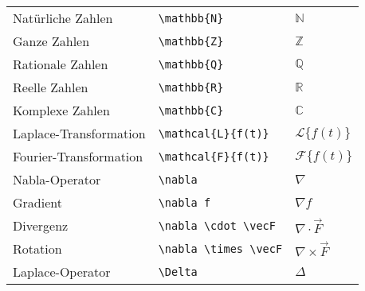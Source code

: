 \begin{longtable}{l l l}
    \midrule
    Natürliche Zahlen         & \texttt{\textbackslash mathbb\{N\}}                                                      & \( \mathbb{N} \)                     \\
    Ganze Zahlen              & \texttt{\textbackslash mathbb\{Z\}}                                                      & \( \mathbb{Z} \)                     \\
    Rationale Zahlen          & \texttt{\textbackslash mathbb\{Q\}}                                                      & \( \mathbb{Q} \)                     \\
    Reelle Zahlen             & \texttt{\textbackslash mathbb\{R\}}                                                      & \( \mathbb{R} \)                     \\
    Komplexe Zahlen           & \texttt{\textbackslash mathbb\{C\}}                                                      & \( \mathbb{C} \)                     \\

    \midrule
    Laplace-Transformation    & \texttt{\textbackslash mathcal\{L\}\{f(t)\}}                                             & \( \mathcal{L}\{f(t)\} \)            \\
    Fourier-Transformation    & \texttt{\textbackslash mathcal\{F\}\{f(t)\}}                                             & \( \mathcal{F}\{f(t)\} \)            \\
    Nabla-Operator            & \texttt{\textbackslash nabla}                                                            & \( \nabla \)                         \\
    Gradient                  & \texttt{\textbackslash nabla f}                                                          & \( \nabla f \)                       \\
    Divergenz                 & \texttt{\textbackslash nabla \textbackslash cdot \textbackslash vec{F}}                  & \( \nabla \cdot \vec{F} \)           \\
    Rotation                  & \texttt{\textbackslash nabla \textbackslash times \textbackslash vec{F}}                 & \( \nabla \times \vec{F} \)          \\
    Laplace-Operator          & \texttt{\textbackslash Delta}                                                            & \( \Delta \)                         \\
\end{longtable}
